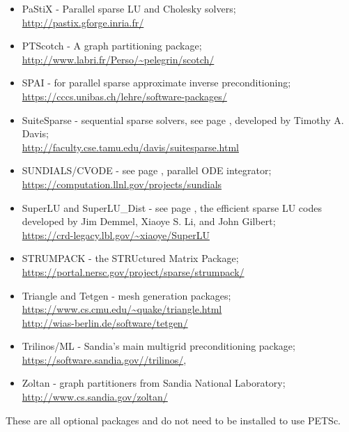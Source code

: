 \begin{itemize}
             \item PaStiX -     Parallel sparse LU and Cholesky solvers; \\\href{http://pastix.gforge.inria.fr/}{http://pastix.gforge.inria.fr/}
             \item PTScotch -    A graph partitioning package; \\\href{http://www.labri.fr/Perso/~pelegrin/scotch/}{http://www.labri.fr/Perso/\~{}pelegrin/scotch/}
  \item SPAI -        for parallel sparse approximate inverse preconditioning;\\ \href{https://cccs.unibas.ch/lehre/software-packages/}{https://cccs.unibas.ch/lehre/software-packages/}
  \item SuiteSparse - sequential sparse solvers, see page \pageref{sec_externalsol}, developed by Timothy A. Davis;\\
                    \href{http://faculty.cse.tamu.edu/davis/suitesparse.html}{http://faculty.cse.tamu.edu/davis/suitesparse.html}
  \item SUNDIALS/CVODE - see page \pageref{sec_sundials}, parallel ODE integrator;\\
                     \href{https://computation.llnl.gov/projects/sundials}{https://computation.llnl.gov/projects/sundials}
  \item SuperLU and SuperLU\_Dist - see page \pageref{sec_externalsol},
                    the efficient sparse LU codes developed by Jim Demmel,  Xiaoye S. Li, and John Gilbert;\\
                    \href{https://crd-legacy.lbl.gov/~xiaoye/SuperLU}{https://crd-legacy.lbl.gov/\~{}xiaoye/SuperLU}
                    \item STRUMPACK - the STRUctured Matrix Package; \\
                    \href{https://portal.nersc.gov/project/sparse/strumpack/}{https://portal.nersc.gov/project/sparse/strumpack/}
  \item Triangle and Tetgen - mesh generation packages; \\
    \href{https://www.cs.cmu.edu/~quake/triangle.html}{https://www.cs.cmu.edu/\~{}quake/triangle.html}\\
    \href{http://wias-berlin.de/software/tetgen/}{http://wias-berlin.de/software/tetgen/}
  \item Trilinos/ML - Sandia's main multigrid preconditioning package; \\\href{https://software.sandia.gov//trilinos/}{https://software.sandia.gov//trilinos/},
  \item Zoltan - graph partitioners from Sandia National Laboratory;\\ \href{http://www.cs.sandia.gov/zoltan/}{http://www.cs.sandia.gov/zoltan/}
\end{itemize}
These are all optional packages and do not need to be installed to use PETSc.

